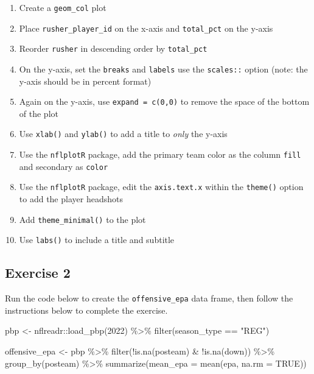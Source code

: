 \documentclass[
  letterpaper,
]{krantz}
\newenvironment{Shaded}{\begin{snugshade}}{\end{snugshade}}
\newcommand{\AttributeTok}[1]{\textcolor[rgb]{0.40,0.45,0.13}{#1}}
\newcommand{\ConstantTok}[1]{\textcolor[rgb]{0.56,0.35,0.01}{#1}}
\newcommand{\DecValTok}[1]{\textcolor[rgb]{0.68,0.00,0.00}{#1}}
\newcommand{\FunctionTok}[1]{\textcolor[rgb]{0.28,0.35,0.67}{#1}}
\newcommand{\NormalTok}[1]{\textcolor[rgb]{0.00,0.23,0.31}{#1}}
\newcommand{\OtherTok}[1]{\textcolor[rgb]{0.00,0.23,0.31}{#1}}
\newcommand{\SpecialCharTok}[1]{\textcolor[rgb]{0.37,0.37,0.37}{#1}}
\newcommand{\StringTok}[1]{\textcolor[rgb]{0.13,0.47,0.30}{#1}}
\providecommand{\tightlist}{%
  \setlength{\itemsep}{0pt}\setlength{\parskip}{0pt}}\usepackage{longtable,booktabs,array}
\begin{document}
\begin{enumerate}
\def\labelenumi{\arabic{enumi}.}
\tightlist
\item
  Create a \texttt{geom\_col} plot
\item
  Place \texttt{rusher\_player\_id} on the x-axis and
  \texttt{total\_pct} on the y-axis
\item
  Reorder \texttt{rusher} in descending order by \texttt{total\_pct}
\item
  On the y-axis, set the \texttt{breaks} and \texttt{labels} use the
  \texttt{scales::} option (note: the y-axis should be in percent
  format)
\item
  Again on the y-axis, use \texttt{expand\ =\ c(0,0)} to remove the
  space of the bottom of the plot
\item
  Use \texttt{xlab()} and \texttt{ylab()} to add a title to \emph{only}
  the y-axis
\item
  Use the \texttt{nflplotR} package, add the primary team color as the
  column \texttt{fill} and secondary as \texttt{color}
\item
  Use the \texttt{nflplotR} package, edit the \texttt{axis.text.x}
  within the \texttt{theme()} option to add the player headshots
\item
  Add \texttt{theme\_minimal()} to the plot
\item
  Use \texttt{labs()} to include a title and subtitle
\end{enumerate}

\hypertarget{exercise-2-2}{%
\subsection{Exercise 2}\label{exercise-2-2}}

Run the code below to create the \texttt{offensive\_epa} data frame,
then follow the instructions below to complete the exercise.

\begin{Shaded}
\begin{Highlighting}[]
\NormalTok{pbp }\OtherTok{\textless{}{-}}\NormalTok{ nflreadr}\SpecialCharTok{::}\FunctionTok{load\_pbp}\NormalTok{(}\DecValTok{2022}\NormalTok{) }\SpecialCharTok{\%\textgreater{}\%}
  \FunctionTok{filter}\NormalTok{(season\_type }\SpecialCharTok{==} \StringTok{"REG"}\NormalTok{)}

\NormalTok{offensive\_epa }\OtherTok{\textless{}{-}}\NormalTok{ pbp }\SpecialCharTok{\%\textgreater{}\%}
  \FunctionTok{filter}\NormalTok{(}\SpecialCharTok{!}\FunctionTok{is.na}\NormalTok{(posteam) }\SpecialCharTok{\&} \SpecialCharTok{!}\FunctionTok{is.na}\NormalTok{(down)) }\SpecialCharTok{\%\textgreater{}\%}
  \FunctionTok{group\_by}\NormalTok{(posteam) }\SpecialCharTok{\%\textgreater{}\%}
  \FunctionTok{summarize}\NormalTok{(}\AttributeTok{mean\_epa =} \FunctionTok{mean}\NormalTok{(epa, }\AttributeTok{na.rm =} \ConstantTok{TRUE}\NormalTok{))}
\end{Highlighting}
\end{Shaded}
\end{document}
